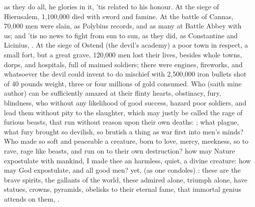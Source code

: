 {as they do all, he glories in it, 'tis related to his honour. At the
siege of Hierusalem, 1,100,000 died with sword and famine. At the
battle of Cannas, 70,000 men were slain, as Polybius records, and
as many at Battle Abbey with us; and 'tis no news to fight from sun to
sun, as they did, as Constantine and Licinius, \etc{}. At the siege of
Ostend (the devil's academy) a poor town in respect, a small fort, but
a great grave, 120,000 men lost their lives, besides whole towns,
dorps, and hospitals, full of maimed soldiers; there were engines,
fireworks, and whatsoever the devil could invent to do mischief with
2,500,000 iron bullets shot of 40 pounds weight, three or four millions
of gold consumed. Who (saith mine author) can be sufficiently
amazed at their flinty hearts, obstinacy, fury, blindness, who without
any likelihood of good success, hazard poor soldiers, and lead them
without pity to the slaughter, which may justly be called the rage of
furious beasts, that run without reason upon their own deaths:
; what plague, what
fury brought so devilish, so brutish a thing as war first into men's
minds? Who made so soft and peaceable a creature, born to love, mercy,
meekness, so to rave, rage like beasts, and run on to their own
destruction? how may Nature expostulate with mankind,  I made thee an harmless, quiet, a divine creature:
how may God expostulate, and all good men? yet,  (as
one condoles) : these
are the brave spirits, the gallants of the world, these admired alone,
triumph alone, have statues, crowns, pyramids, obelisks to their
eternal fame, that immortal genius attends on them, .

}
